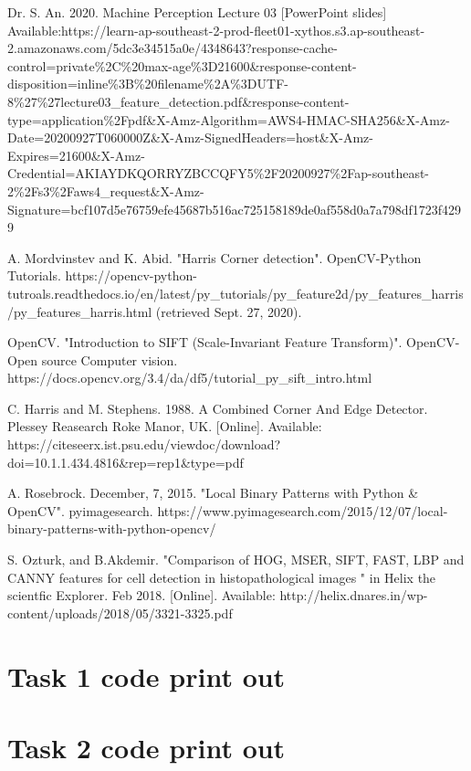 \documentclass[conference]{IEEEtran}
\begin{document}
\newpage
\clearpage
\begin{thebibliography}{00}
 Dr. S. An. 2020. Machine Perception Lecture 03 [PowerPoint slides] Available:https://learn-ap-southeast-2-prod-fleet01-xythos.s3.ap-southeast-2.amazonaws.com/5dc3e34515a0e/4348643?response-cache-control=private\%2C\%20max-age\%3D21600\&response-content-disposition=inline\%3B\%20filename\%2A\%3DUTF-8\%27\%27lecture03\_feature\_detection.pdf\&response-content-type=application\%2Fpdf\&X-Amz-Algorithm=AWS4-HMAC-SHA256\&X-Amz-Date=20200927T060000Z\&X-Amz-SignedHeaders=host\&X-Amz-Expires=21600\&X-Amz-Credential=AKIAYDKQORRYZBCCQFY5\%2F20200927\%2Fap-southeast-2\%2Fs3\%2Faws4\_request\&X-Amz-Signature=bcf107d5e76759efe45687b516ac725158189de0af558d0a7a798df1723f4299

A. Mordvinstev and K. Abid. "Harris Corner detection". OpenCV-Python Tutorials. https://opencv-python-tutroals.readthedocs.io/en/latest/py\_tutorials/py\_feature2d/py\_features\_harris/py\_features\_harris.html (retrieved Sept. 27, 2020).

OpenCV. "Introduction to SIFT (Scale-Invariant Feature Transform)". OpenCV-Open source Computer vision. https://docs.opencv.org/3.4/da/df5/tutorial\_py\_sift\_intro.html

C. Harris and M. Stephens. 1988. A Combined Corner And Edge Detector. Plessey Reasearch Roke Manor, UK. [Online]. Available: https://citeseerx.ist.psu.edu/viewdoc/download?doi=10.1.1.434.4816\&rep=rep1\&type=pdf

A. Rosebrock. December, 7, 2015. "Local Binary Patterns with Python \& OpenCV". pyimagesearch. https://www.pyimagesearch.com/2015/12/07/local-binary-patterns-with-python-opencv/

 S. Ozturk, and B.Akdemir. "Comparison of HOG, MSER, SIFT, FAST, LBP and CANNY features for cell detection in histopathological images " in Helix the scientfic Explorer. Feb 2018. [Online]. Available: http://helix.dnares.in/wp-content/uploads/2018/05/3321-3325.pdf


\end{thebibliography}

\appendix

\begin{appendices}
	\section{Task 1 code print out}\label{ap 1}

	\section{Task 2 code print out}
\end{appendices}
\end{document}
